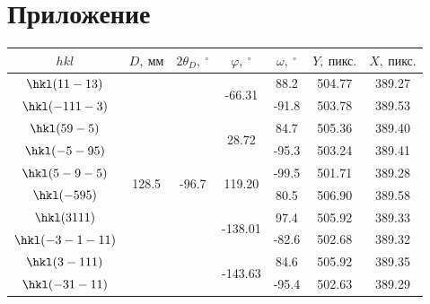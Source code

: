 \documentclass[a4paper,14pt]{extarticle}
\newcommand{\unit}[1]{ \ \text{#1}}
\newcommand{\degree}{^\circ}
\begin{document}
\section*{Приложение}
\begin{table}[ht!]
    \centering
    \begin{tabular}{ |c|c|c|c|c|c|c| }
        \hline
                    $hkl$ &           $D,\unit{мм}$ &  $2\theta_D, \ \degree$ &     $\varphi, \ \degree$ & $\omega, \ \degree$ &    $Y,\unit{пикс.}$ &    $X,\unit{пикс.}$ \\
        \hline
        $  \hkl(11 -1 3)$ & \multirow{20}{*}{128.5} & \multirow{10}{*}{-96.7} &  \multirow{2}{*}{-66.31} &                88.2 &              504.77 &              389.27 \\
        $ \hkl(-11 1 -3)$ &                         &                         &                          &               -91.8 &              503.78 &              389.53 \\
        $   \hkl(5 9 -5)$ &                         &                         &   \multirow{2}{*}{28.72} &                84.7 &              505.36 &              389.40 \\
        $  \hkl(-5 -9 5)$ &                         &                         &                          &               -95.3 &              503.24 &              389.41 \\
        $  \hkl(5 -9 -5)$ &                         &                         &  \multirow{2}{*}{119.20} &               -99.5 &              501.71 &              389.28 \\
        $   \hkl(-5 9 5)$ &                         &                         &                          &                80.5 &              506.90 &              389.58 \\
        $   \hkl(3 1 11)$ &                         &                         & \multirow{2}{*}{-138.01} &                97.4 &              505.92 &              389.33 \\
        $\hkl(-3 -1 -11)$ &                         &                         &                          &               -82.6 &              502.68 &              389.32 \\
        $  \hkl(3 -1 11)$ &                         &                         & \multirow{2}{*}{-143.63} &                84.6 &              505.92 &              389.35 \\
        $ \hkl(-3 1 -11)$ &                         &                         &                          &               -95.4 &              502.63 &              389.29 \\

\end{tabular}
\end{table}
\end{document}

